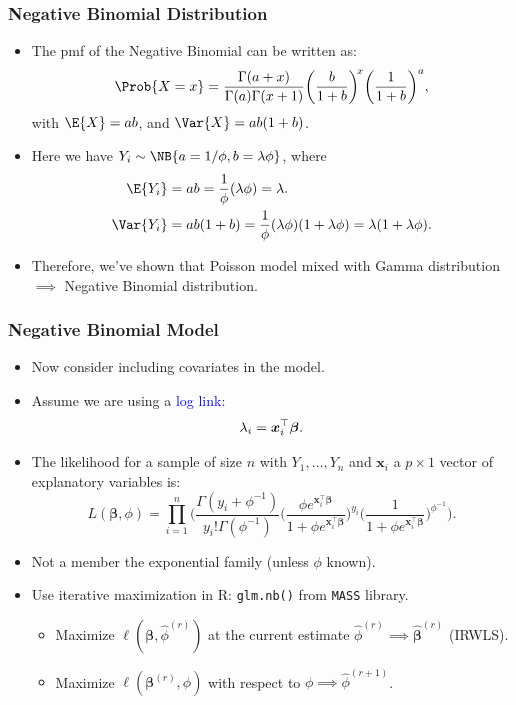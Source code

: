 \documentclass[oneside]{book}\usepackage[]{graphicx}\usepackage[svgnames]{xcolor}
\let\log\relax%
\providecommand{\Vector}[1]{\bm{#1}}%
\begin{document}
\subsubsection*{Negative Binomial Distribution}
\begin{itemize}
      \item The pmf of the Negative Binomial can be written as:
            \[ \Prob{X=x}=\frac{\Gamma(a+x)}{\Gamma(a)\Gamma(x+1)}\biggl(\frac{b}{1+b}\biggr)^{\!x}\biggl(\frac{1}{1+b}\biggr)^{a}, \]
            with $ \E{X}=ab $, and $ \Var{X}=ab(1+b) $.
      \item Here we have $ Y_i \sim \NB{a=1/\phi,b=\lambda\phi} $, where
            \begin{align*}
                  \E{Y_i}   & =ab=\frac{1}{\phi}(\lambda\phi)=\lambda.                                    \\
                  \Var{Y_i} & =ab(1+b)=\frac{1}{\phi}(\lambda\phi)(1+\lambda\phi)=\lambda(1+\lambda\phi).
            \end{align*}
      \item Therefore, we've shown that Poisson model mixed with Gamma distribution $ \implies $ Negative Binomial distribution.
\end{itemize}
\subsubsection*{Negative Binomial Model}
\begin{itemize}
      \item Now consider including covariates in the model.
      \item Assume we are using a \textcolor{Blue}{log link}:
            \[ \log{\lambda_i}=\Vector{x}_i^\top \Vector{\beta}. \]
      \item The likelihood for a sample of size $ n $ with $ Y_1,\ldots,Y_n $ and $ \Vector{x}_i $ a $ p\times 1 $ vector of explanatory
            variables is:
            \[ L(\Vector{\beta},\phi)=\prod_{i=1}^n
                  \biggl(\frac{\Gamma(y_i+\phi^{-1})}{y_i!\Gamma(\phi^{-1})}
                  \biggl(\frac{\phi e^{\Vector{x}_i^\top \Vector{\beta}}}{1+\phi e^{\Vector{x}_i^\top \Vector{\beta}}}\biggr)^{\!y_i}
                  \biggl(\frac{1}{1+\phi e^{\Vector{x}_i^\top \Vector{\beta}}}\biggr)^{\!\phi^{-1}}
                  \biggr). \]
      \item Not a member the exponential family (unless $ \phi $ known).
      \item Use iterative maximization in R: \texttt{glm.nb()} from \texttt{MASS} library.
            \begin{itemize}
                  \item Maximize $ \ell(\Vector{\beta},\hat{\phi}^{(r)}) $ at the current estimate $ \hat{\phi}^{(r)}\implies \hat{\Vector{\beta}}^{(r)} $ (IRWLS).
                  \item Maximize $ \ell(\Vector{\beta}^{(r)},\phi) $ with respect to $ \phi\implies \hat{\phi}^{(r+1)} $.
            \end{itemize}
\end{itemize}
\end{document}
